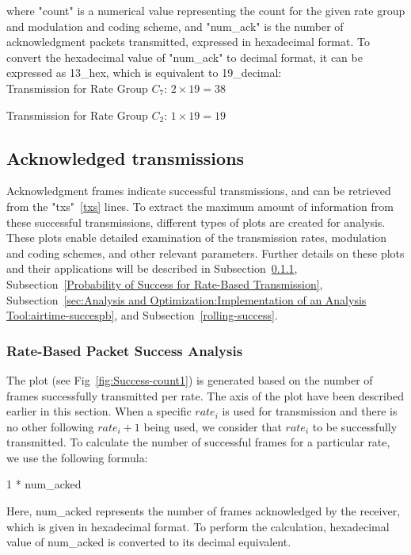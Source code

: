 where "count" is a numerical value representing the count for the given rate group and modulation and coding scheme, and "num\_ack" is the number of acknowledgment packets transmitted, expressed in hexadecimal format. To convert the hexadecimal value of "num\_ack" to decimal format, it can be expressed as 13\_hex, which is equivalent to 19\_decimal:\\

Transmission for Rate Group $C_7$: $2 \times 19 = 38$

Transmission for Rate Group $C_2$: $1 \times 19 = 19$
\newpage

\subsection{Acknowledged transmissions}
Acknowledgment frames indicate successful transmissions, and can be retrieved from the "txs"~\ref{txs} lines. To extract the maximum amount of information from these successful transmissions, different types of plots are created for analysis. These plots enable detailed examination of the transmission rates, modulation and coding schemes, and other relevant parameters. Further details on these plots and their applications will be described in Subsection~\ref{sec:Analysis and Optimization:Implementation of an Analysis Tool:success-count}, Subsection~\ref{Probability of Success for Rate-Based Transmission}, Subsection~\ref{sec:Analysis and Optimization:Implementation of an Analysis Tool:airtime-succespb}, and Subsection~\ref{rolling-success}.

\subsubsection{Rate-Based Packet Success Analysis}
\label{sec:Analysis and Optimization:Implementation of an Analysis Tool:success-count}
The plot (see Fig~\ref{fig:Success-count1}) is generated based on the number of frames successfully transmitted per rate. The axis of the plot have been described earlier in this section. When a specific $rate_i$ is used for transmission and there is no other following $rate_i+1$ being used, we consider that $rate_i$ to be successfully transmitted. To calculate the number of successful frames for a particular rate, we use the following formula:

\vspace{0.25cm}
1 * num\_acked
\vspace{0.25cm}

Here, num\_acked represents the number of frames acknowledged by the receiver, which is given in hexadecimal format. To perform the calculation, hexadecimal value of num\_acked is converted to its decimal equivalent.

